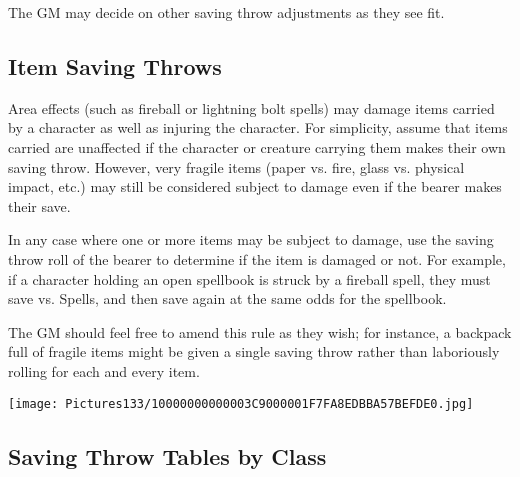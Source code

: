 \documentclass[a4paper,twoside,openany,10pt]{book}
\begin{document}
\begin{multicols}{2}
The GM may decide on other saving throw adjustments as they see fit.

\subsection{Item Saving Throws}\label{item-saving-throws}

Area effects (such as fireball or lightning bolt spells) may damage items carried by a character as well as injuring the character. For simplicity, assume that items carried are unaffected if the character or creature carrying them makes their own saving throw. However, very fragile items (paper vs. fire, glass vs. physical impact, etc.) may still be considered subject to damage even if the bearer makes their save.

In any case where one or more items may be subject to damage, use the saving throw roll of the bearer to determine if the item is damaged or not. For example, if a character holding an open spellbook is struck by a fireball spell, they must save vs. Spells, and then save again at the same odds for the spellbook.

The GM should feel free to amend this rule as they wish; for instance, a backpack full of fragile items might be given a single saving throw rather than laboriously rolling for each and every item.

\end{multicols}

\vfill

\begin{center}
	\texttt{[image: Pictures133/10000000000003C9000001F7FA8EDBBA57BEFDE0.jpg]}
\end{center}

\pagebreak


\subsection{Saving Throw Tables by Class}\label{saving-throw-tables-by-class}
\end{document}
